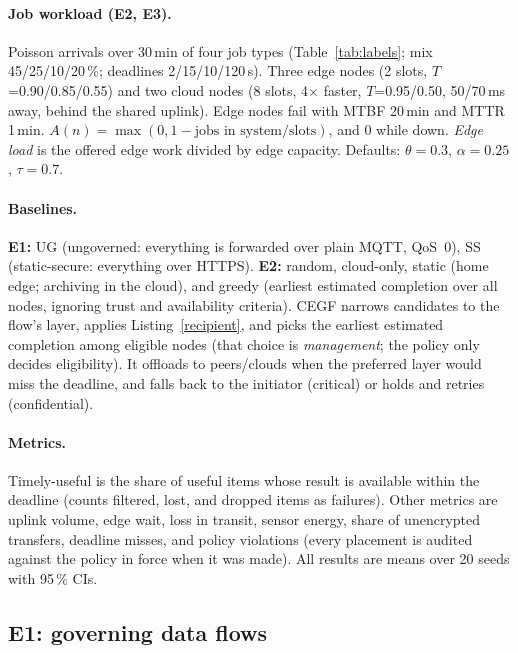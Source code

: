 \paragraph{Job workload (E2, E3).} Poisson arrivals over 30\,min of four job types (Table~\ref{tab:labels}; mix
45/25/10/20\,\%; deadlines 2/15/10/120\,s). Three edge nodes (2 slots, $T$=0.90/0.85/0.55) and two cloud nodes
(8 slots, 4$\times$ faster, $T$=0.95/0.50, 50/70\,ms away, behind the shared uplink). Edge nodes fail with MTBF 20\,min
and MTTR 1\,min. $A(n)=\max(0,1-\text{jobs in system}/\text{slots})$, and $0$ while down. \emph{Edge load} is the
offered edge work divided by edge capacity. Defaults: $\theta=0.3$, $\alpha=0.25$, $\tau=0.7$.

\paragraph{Baselines.} \textbf{E1:} \textsf{UG} (ungoverned: everything is forwarded over plain MQTT, QoS~0),
\textsf{SS} (static-secure: everything over HTTPS). \textbf{E2:} \textsf{random}, \textsf{cloud-only},
\textsf{static} (home edge; archiving in the cloud), and \textsf{greedy} (earliest estimated completion over all
nodes, ignoring trust and availability criteria). \textsf{CEGF} narrows candidates to the flow's layer, applies
Listing~\ref{recipient}, and picks the earliest estimated completion among eligible nodes (that choice is
\emph{management}; the policy only decides eligibility). It offloads to peers/clouds when the preferred layer would
miss the deadline, and falls back to the initiator (critical) or holds and retries (confidential).

\paragraph{Metrics.} \textsf{Timely-useful} is the share of useful items whose result is available within the
deadline (counts filtered, lost, and dropped items as failures). Other metrics are uplink volume, edge wait, loss in
transit, sensor energy, share of unencrypted transfers, deadline misses, and policy violations (every placement is
audited against the policy in force when it was made). All results are means over 20 seeds with 95\,\% CIs.

\subsection{E1: governing data flows}
